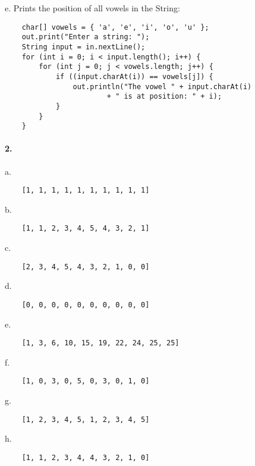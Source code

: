 \documentclass[10pt]{article}
\begin{document}
\begin{list}{} {}
\item {e. } Prints the position of all vowels in the String: 
\begin{lstlisting}
    char[] vowels = { 'a', 'e', 'i', 'o', 'u' };
    out.print("Enter a string: ");
    String input = in.nextLine();
    for (int i = 0; i < input.length(); i++) {
        for (int j = 0; j < vowels.length; j++) {
            if ((input.charAt(i)) == vowels[j]) {
                out.println("The vowel " + input.charAt(i)
                        + " is at position: " + i);
            }
        }
    }
\end{lstlisting}
\end{list}

\paragraph{2. }
\begin{list}{} {}
\item {a. }
\begin{lstlisting}
	[1, 1, 1, 1, 1, 1, 1, 1, 1, 1]
\end{lstlisting}

\item {b. }
\begin{lstlisting}
	[1, 1, 2, 3, 4, 5, 4, 3, 2, 1]
\end{lstlisting}

\item {c. }
\begin{lstlisting}
	[2, 3, 4, 5, 4, 3, 2, 1, 0, 0]
\end{lstlisting}

\item {d. }
\begin{lstlisting}
	[0, 0, 0, 0, 0, 0, 0, 0, 0, 0]
\end{lstlisting}

\item {e. }
\begin{lstlisting}
	[1, 3, 6, 10, 15, 19, 22, 24, 25, 25]
\end{lstlisting}

\item {f. }
\begin{lstlisting}
	[1, 0, 3, 0, 5, 0, 3, 0, 1, 0]
\end{lstlisting}

\item {g. }
\begin{lstlisting}
	[1, 2, 3, 4, 5, 1, 2, 3, 4, 5]
\end{lstlisting}

\item {h. }
\begin{lstlisting}
	[1, 1, 2, 3, 4, 4, 3, 2, 1, 0]
\end{lstlisting}

\end{list}
\end{document}
